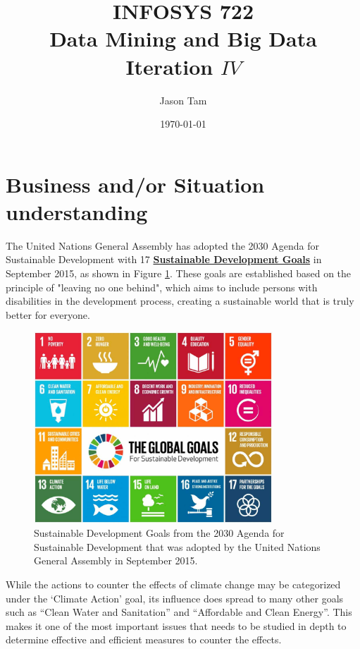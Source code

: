 \documentclass[11pt,a4paper,titlepage]{article}
\title{\blue INFOSYS 722 \\
Data Mining and Big Data \\
\blueb Iteration $IV$}
\author{Jason Tam}
\date{\today}
\newcommand{\blankline}{\quad\pagebreak[2]}
\begin{document}
\maketitle

\section{Business and/or Situation understanding}

The United Nations General Assembly has adopted the 2030 Agenda for Sustainable Development with 17 \href{https://www.un.org/development/desa/disabilities/envision2030.html}{\textbf{Sustainable Development Goals}} in September 2015, as shown in Figure \ref{fig:UNGoals}. These goals are established based on the principle of "leaving no one behind", which aims to include persons with disabilities in the development process, creating a sustainable world that is truly better for everyone.

\blankline

\begin{figure}[!htbp]
    \begin{center}
        \includegraphics[width=0.8\textwidth]{UNGoals.png}
        \caption{Sustainable Development Goals from the 2030 Agenda for Sustainable Development that was adopted by the United Nations General Assembly in September 2015.}
        \label{fig:UNGoals}
    \end{center}
\end{figure}
 
While the actions to counter the effects of climate change may be categorized under the ‘Climate Action’ goal, its influence does spread to many other goals such as “Clean Water and Sanitation” and “Affordable and Clean Energy”. This makes it one of the most important issues that needs to be studied in depth to determine effective and efficient measures to counter the effects. 
\end{document}
